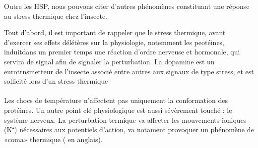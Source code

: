 Outre les HSP, nous pouvons citer d'autres phénomènes constituant une réponse au stress thermique chez l'insecte.

Tout d'abord, il est important de rappeler que le stress thermique, avant d'exercer ses effets délétères sur la physiologie, notemment les peotéines, induitdans un premier temps une réaction d'ordre nerveuse et hormonale, qui servira de signal afin de signaler la perturbation.
La dopamine est un eurotrnsmetteur de l'insecte associé entre autres aux signaux de type stress, et est sollicité lors d'un stress thermique \cite{andersen2006}


\paragraph{}

Les chocs de température n'affectent pas uniquement la conformation des protéines.
Un autre point clé physiologique est aussi sévèrement touché : le système nerveux.
La perturbation termique va affecter les mouvements ioniques (K⁺) nécessaires aux potentiels d'action, va notament provoquer un phénomène de «coma» thermique ( en anglais).
